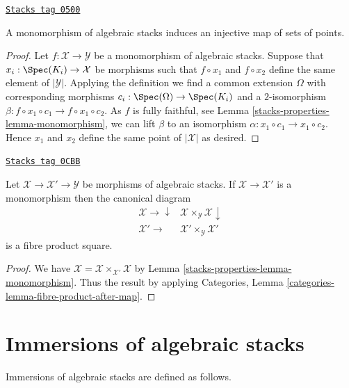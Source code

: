 \begin{lemma}
\label{stacks-properties-lemma-monomorphism-injective-points}
\href{https://stacks.math.columbia.edu/tag/0500}{\texttt{Stacks tag 0500}}


A monomorphism of algebraic stacks induces an injective map of
sets of points.
\end{lemma}

\begin{proof}
Let $f : \mathcal{X} \to \mathcal{Y}$ be a monomorphism of algebraic stacks.
Suppose that $x_i : \Spec(K_i) \to \mathcal{X}$ be morphisms such that
$f \circ x_1$ and $f \circ x_2$ define the same element of $|\mathcal{Y}|$.
Applying the definition we find a common extension $\Omega$ with corresponding
morphisms $c_i : \Spec(\Omega) \to \Spec(K_i)$ and a
$2$-isomorphism $\beta : f \circ x_1 \circ c_1 \to f \circ x_1 \circ c_2$.
As $f$ is fully faithful, see
Lemma \ref{stacks-properties-lemma-monomorphism},
we can lift $\beta$ to an isomorphism
$\alpha : x_1 \circ c_1 \to x_1 \circ c_2$.
Hence $x_1$ and $x_2$ define the same point of $|\mathcal{X}|$
as desired.
\end{proof}

\begin{lemma}
\label{stacks-properties-lemma-monomorphism-diagonal}
\href{https://stacks.math.columbia.edu/tag/0CBB}{\texttt{Stacks tag 0CBB}}

Let $\mathcal{X} \to \mathcal{X}' \to \mathcal{Y}$ be morphisms
of algebraic stacks. If $\mathcal{X} \to \mathcal{X}'$ is a monomorphism
then the canonical diagram
$$
\begin{array}{cc}\mathcal{X} \longrightarrow\downarrow & \mathcal{X} \times_\mathcal{Y} \mathcal{X} \downarrow \\ \mathcal{X}' \longrightarrow & \mathcal{X}' \times_\mathcal{Y} \mathcal{X}'\end{array}
$$
is a fibre product square.
\end{lemma}

\begin{proof}
We have $\mathcal{X} = \mathcal{X} \times_{\mathcal{X}'} \mathcal{X}$
by Lemma \ref{stacks-properties-lemma-monomorphism}. Thus the result by applying
Categories, Lemma \ref{categories-lemma-fibre-product-after-map}.
\end{proof}

\section{Immersions of algebraic stacks}
\label{stacks-properties-section-immersions}
Immersions of algebraic stacks are defined as follows.

